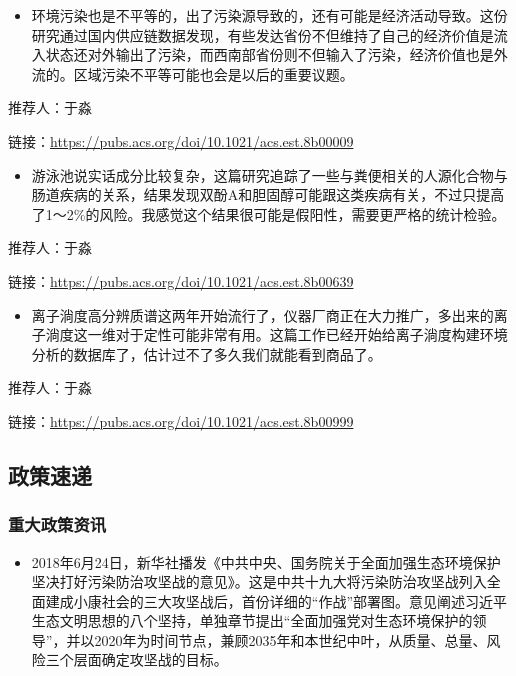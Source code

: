 \documentclass[]{book}
\providecommand{\tightlist}{%
  \setlength{\itemsep}{0pt}\setlength{\parskip}{0pt}}
\begin{document}
\begin{itemize}
\tightlist
\item
  环境污染也是不平等的，出了污染源导致的，还有可能是经济活动导致。这份研究通过国内供应链数据发现，有些发达省份不但维持了自己的经济价值是流入状态还对外输出了污染，而西南部省份则不但输入了污染，经济价值也是外流的。区域污染不平等可能也会是以后的重要议题。
\end{itemize}

推荐人：于淼

链接：\url{https://pubs.acs.org/doi/10.1021/acs.est.8b00009}

\begin{itemize}
\tightlist
\item
  游泳池说实话成分比较复杂，这篇研究追踪了一些与粪便相关的人源化合物与肠道疾病的关系，结果发现双酚A和胆固醇可能跟这类疾病有关，不过只提高了1～2\%的风险。我感觉这个结果很可能是假阳性，需要更严格的统计检验。
\end{itemize}

推荐人：于淼

链接：\url{https://pubs.acs.org/doi/10.1021/acs.est.8b00639}

\begin{itemize}
\tightlist
\item
  离子淌度高分辨质谱这两年开始流行了，仪器厂商正在大力推广，多出来的离子淌度这一维对于定性可能非常有用。这篇工作已经开始给离子淌度构建环境分析的数据库了，估计过不了多久我们就能看到商品了。
\end{itemize}

推荐人：于淼

链接：\url{https://pubs.acs.org/doi/10.1021/acs.est.8b00999}

\subsection*{政策速递}\label{-2}

\subsubsection*{重大政策资讯}\label{-2}

\begin{itemize}
\tightlist
\item
  2018年6月24日，新华社播发《中共中央、国务院关于全面加强生态环境保护
  坚决打好污染防治攻坚战的意见》。这是中共十九大将污染防治攻坚战列入全面建成小康社会的三大攻坚战后，首份详细的``作战''部署图。意见阐述习近平生态文明思想的八个坚持，单独章节提出``全面加强党对生态环境保护的领导''，并以2020年为时间节点，兼顾2035年和本世纪中叶，从质量、总量、风险三个层面确定攻坚战的目标。
\end{itemize}
\end{document}
